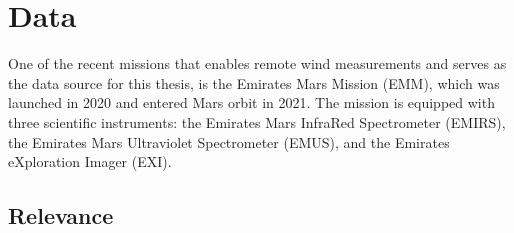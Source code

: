 \chapter{Data\label{chap:data}}

One of the recent missions that enables remote wind measurements and serves as the data source for this thesis, is the Emirates Mars Mission (EMM), which was launched in 2020 and entered Mars orbit in 2021. The mission is equipped with three scientific instruments: the Emirates Mars InfraRed Spectrometer (EMIRS), the Emirates Mars Ultraviolet Spectrometer (EMUS), and the Emirates eXploration Imager (EXI)\cite{Amiri2022}.

\section{Relevance}

